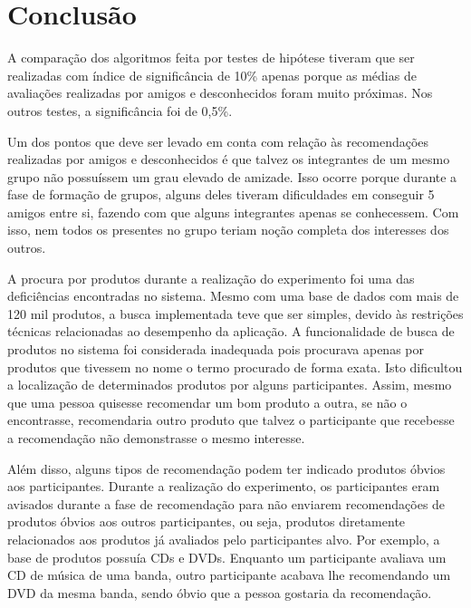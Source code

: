 

\section{Conclusão}
\label{conclusao}

 A comparação dos algoritmos feita por testes de hipótese tiveram que ser realizadas com índice de
 significância de 10\% apenas porque as médias de avaliações realizadas por amigos e desconhecidos foram muito
 próximas. Nos outros testes, a significância foi de 0,5\%.

  Um dos pontos que deve ser levado em conta com relação às recomendações realizadas por amigos e desconhecidos
 é que talvez os integrantes de um mesmo grupo não possuíssem um grau elevado de amizade. Isso ocorre porque
 durante a fase de formação de grupos, alguns deles tiveram dificuldades em conseguir 5 amigos entre si, fazendo
 com que alguns integrantes apenas se conhecessem. Com isso, nem todos os presentes no grupo teriam noção
 completa dos interesses dos outros.

  A procura por produtos durante a realização do experimento foi uma das deficiências encontradas no sistema.
 Mesmo com uma base de dados com mais de 120 mil produtos, a busca implementada teve que ser simples, devido às
 restrições técnicas relacionadas ao desempenho da aplicação. A funcionalidade de busca de produtos no sistema foi considerada inadequada pois procurava apenas por produtos que tivessem no nome o termo procurado de forma exata. Isto dificultou a localização de determinados produtos por alguns participantes. Assim, mesmo que uma pessoa quisesse recomendar um bom produto a outra, se não o encontrasse, recomendaria outro produto que talvez o participante que recebesse a recomendação não demonstrasse o mesmo interesse.

  Além disso, alguns tipos de recomendação podem ter indicado produtos óbvios aos participantes. Durante a
 realização do experimento, os participantes eram avisados durante a fase de recomendação para não enviarem
 recomendações de produtos óbvios aos outros participantes, ou seja, produtos diretamente relacionados aos
 produtos já avaliados pelo participantes alvo. Por exemplo, a base de produtos possuía CDs e DVDs. Enquanto um
 participante avaliava um CD de música de uma banda, outro participante acabava lhe recomendando um DVD da mesma
 banda, sendo óbvio que a pessoa gostaria da recomendação.


